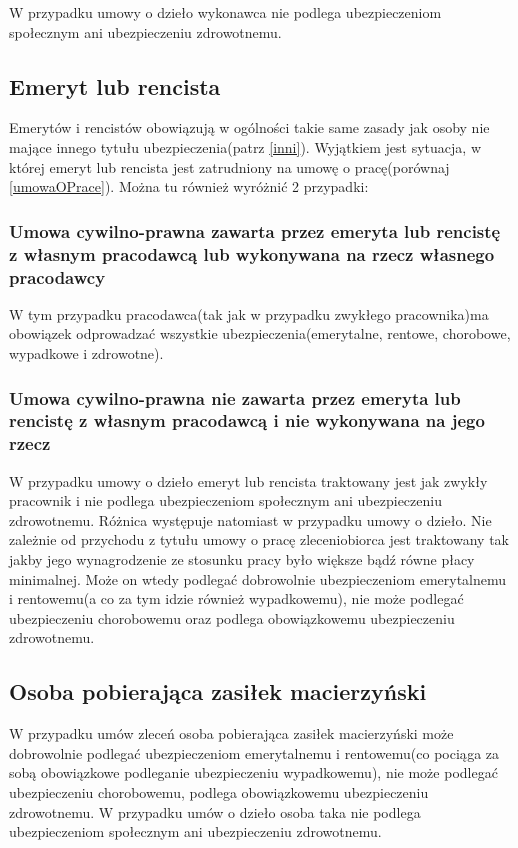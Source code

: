 W przypadku umowy o dzieło wykonawca nie podlega ubezpieczeniom społecznym ani ubezpieczeniu zdrowotnemu.

\subsection[Emeryt lub rencista][Emeryt lub rencista]{Emeryt lub rencista}
Emerytów i rencistów obowiązują w ogólności takie same zasady jak osoby nie mające innego tytułu ubezpieczenia(patrz \ref{inni}).
Wyjątkiem jest sytuacja, w której emeryt lub rencista jest zatrudniony na umowę o pracę(porównaj \ref{umowaOPrace}). Można tu również wyróżnić 2 przypadki:

\subsubsection{Umowa cywilno-prawna zawarta przez emeryta lub rencistę z własnym pracodawcą lub wykonywana na rzecz własnego pracodawcy}
W tym przypadku pracodawca(tak jak w przypadku zwykłego pracownika)ma obowiązek odprowadzać wszystkie ubezpieczenia(emerytalne, rentowe, chorobowe, wypadkowe i zdrowotne).

\subsubsection{Umowa cywilno-prawna nie zawarta przez emeryta lub rencistę z własnym pracodawcą i nie wykonywana na jego rzecz}
W przypadku umowy o dzieło emeryt lub rencista traktowany jest jak zwykły pracownik i nie podlega ubezpieczeniom społecznym ani ubezpieczeniu zdrowotnemu. Różnica występuje natomiast w przypadku umowy o dzieło. Nie zależnie od przychodu z tytułu umowy o pracę zleceniobiorca jest traktowany tak jakby jego wynagrodzenie ze stosunku pracy było większe bądź równe płacy minimalnej. Może on wtedy podlegać dobrowolnie ubezpieczeniom emerytalnemu i rentowemu(a co za tym idzie również wypadkowemu), nie może podlegać ubezpieczeniu chorobowemu oraz podlega obowiązkowemu ubezpieczeniu zdrowotnemu.

\subsection[Osoba pobierająca zasiłek macierzyński][Osoba pobierająca zasiłek macierzyński]{Osoba pobierająca zasiłek macierzyński}
W przypadku umów zleceń osoba pobierająca zasiłek macierzyński może dobrowolnie podlegać ubezpieczeniom emerytalnemu i rentowemu(co pociąga za sobą obowiązkowe podleganie ubezpieczeniu wypadkowemu), nie może podlegać ubezpieczeniu chorobowemu, podlega obowiązkowemu ubezpieczeniu zdrowotnemu. W przypadku umów o dzieło osoba taka nie podlega ubezpieczeniom społecznym ani ubezpieczeniu zdrowotnemu.

